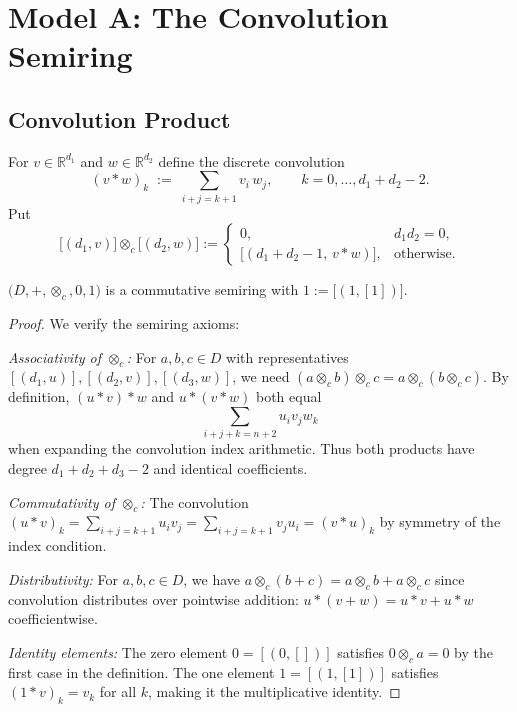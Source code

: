 \section{Model A: The Convolution Semiring}
\label{sec:modelA}
\subsection{Convolution Product}
\begin{definition}
For \(v\in\mathbb R^{d_1}\) and \(w\in\mathbb R^{d_2}\) define the discrete convolution
\[
  (v\ast w)_k \;:=\;\sum_{i+j=k+1} v_i\,w_j,\qquad k=0,\dots,d_1+d_2-2.
\]
Put
\[
  \bigl[(d_1,v)\bigr]\otimes_c\bigl[(d_2,w)\bigr]
  :=\begin{cases}
       0, & d_1d_2=0, \\
       \bigl[(d_1+d_2-1,\,v\ast w)\bigr], & \text{otherwise.}
     \end{cases}
\]
\end{definition}


\begin{theorem}\label{thm:convSemiring}
\(\bigl(D,+,\otimes_c,0,1\bigr)\) is a commutative semiring with \(1:=\bigl[(1,[1])\bigr]\).
\end{theorem}
\begin{proof}
We verify the semiring axioms:

\textit{Associativity of $\otimes_c$:}
For $a, b, c \in D$ with representatives $[(d_1,u)], [(d_2,v)], [(d_3,w)]$, we need $(a \otimes_c b) \otimes_c c = a \otimes_c (b \otimes_c c)$. By definition, $(u \ast v) \ast w$ and $u \ast (v \ast w)$ both equal
\[
\sum_{i+j+k=n+2} u_i v_j w_k
\]
when expanding the convolution index arithmetic. Thus both products have degree $d_1 + d_2 + d_3 - 2$ and identical coefficients.

\textit{Commutativity of $\otimes_c$:}
The convolution $(u \ast v)_k = \sum_{i+j=k+1} u_i v_j = \sum_{i+j=k+1} v_j u_i = (v \ast u)_k$ by symmetry of the index condition.

\textit{Distributivity:}
For $a, b, c \in D$, we have $a \otimes_c (b + c) = a \otimes_c b + a \otimes_c c$ since convolution distributes over pointwise addition: $u \ast (v + w) = u \ast v + u \ast w$ coefficientwise.

\textit{Identity elements:}
The zero element $0 = [(0,[])]$ satisfies $0 \otimes_c a = 0$ by the first case in the definition. The one element $1 = [(1,[1])]$ satisfies $(1 \ast v)_k = v_k$ for all $k$, making it the multiplicative identity.
\end{proof}

